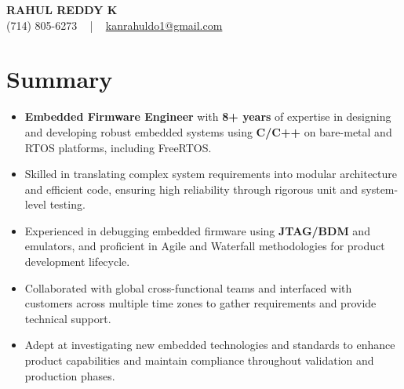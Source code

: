 \documentclass[letterpaper,11pt]{article}
\newcommand{\resumeItem}[1]{
  \item\footnotesize{
    {#1 \vspace{-2pt}}
  }
}
\newcommand{\resumeItemListStart}{\begin{itemize}[leftmargin=*]}
\newcommand{\resumeItemListEnd}{\end{itemize}\vspace{-5pt}}
\begin{document}
\begin{center}
    {\fontsize{14pt}{12pt}\selectfont \textbf{\MakeUppercase{Rahul Reddy K}}}\\ \vspace{2pt}
    \fontsize{10pt}{12pt}\selectfont (714) 805-6273 ~ | ~ \href{mailto:kanrahuldo1@gmail.com}{kanrahuldo1@gmail.com}~
    \vspace{-8pt}
\end{center}

\section{Summary}
\fontsize{9pt}{10pt}\selectfont
\resumeItemListStart
    \resumeItem{\textbf{Embedded Firmware Engineer} with \textbf{8+ years} of expertise in designing and developing robust embedded systems using \textbf{C/C++} on bare-metal and RTOS platforms, including FreeRTOS.}
    \resumeItem{Skilled in translating complex system requirements into modular architecture and efficient code, ensuring high reliability through rigorous unit and system-level testing.}
    \resumeItem{Experienced in debugging embedded firmware using \textbf{JTAG/BDM} and emulators, and proficient in Agile and Waterfall methodologies for product development lifecycle.}
    \resumeItem{Collaborated with global cross-functional teams and interfaced with customers across multiple time zones to gather requirements and provide technical support.}
    \resumeItem{Adept at investigating new embedded technologies and standards to enhance product capabilities and maintain compliance throughout validation and production phases.}
\resumeItemListEnd
\vspace{-6pt}
\end{document}
